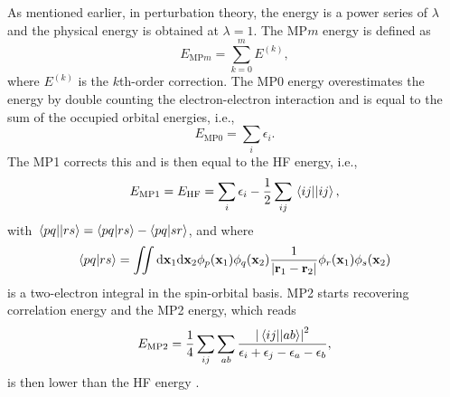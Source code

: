 \documentclass[11pt,a4paper]{article}
\begin{document}
As mentioned earlier, in perturbation theory, the energy is a power series of $\lambda$ and the physical energy is obtained at $\lambda = 1$. 
The MP$m$ energy is defined as 
\begin{equation}
	E_{\text{MP}m}= \sum_{k=0}^m E^{(k)},
\end{equation}
where $E^{(k)}$ is the $k$th-order correction.
The MP0 energy overestimates the energy by double counting the electron-electron interaction and is equal to the sum of the occupied orbital energies, i.e.,
\begin{equation}
	E_{\text{MP0}} = \sum_i \epsilon_i.
\end{equation}
The MP1 corrects this and is then equal to the HF energy, i.e.,
\begin{equation}
	E_{\text{MP1}} = E_\text{HF} = \sum_i \epsilon_i - \frac{1}{2} \sum_{ij} \mel{ij}{}{ij},
\end{equation}
with $\mel{pq}{}{rs} = \braket{pq}{rs} - \braket{pq}{sr}$, and where  
\begin{equation}
	\braket{pq}{rs} = \iint \dd\vb{x}_1\dd\vb{x}_2\phi_p(\vb{x}_1)\phi_q(\vb{x}_2)\frac{1}{\abs{\vb{r}_1 - \vb{r}_2}}\phi_r(\vb{x}_1)\phi_s(\vb{x}_2)
\end{equation}
is a two-electron integral in the spin-orbital basis.
MP2 starts recovering correlation energy and the MP2 energy, which reads
\begin{equation}\label{eq:EMP2}
	E_{\text{MP2}} = \frac{1}{4} \sum_{ij} \sum_{ab} \frac{\abs{\mel{ij}{}{ab}}^2}{\epsilon_i + \epsilon_j - \epsilon_a - \epsilon_b},
\end{equation}
is then lower than the HF energy \cite{SzaboBook}.
\end{document}
